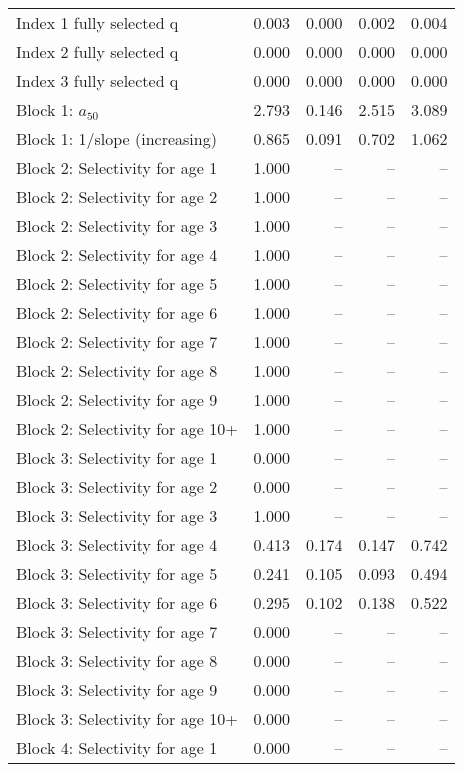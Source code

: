 \documentclass[
]{article}
\begin{document}
\begin{landscape}
\begin{longtable}[t]{lrrrr}
\endfoot
\bottomrule
\endlastfoot
Index 1 fully selected q & 0.003 & 0.000 & 0.002 & 0.004\\
Index 2 fully selected q & 0.000 & 0.000 & 0.000 & 0.000\\
Index 3 fully selected q & 0.000 & 0.000 & 0.000 & 0.000\\
Block 1: $a_{50}$ & 2.793 & 0.146 & 2.515 & 3.089\\
Block 1: 1/slope (increasing) & 0.865 & 0.091 & 0.702 & 1.062\\
\addlinespace
Block 2: Selectivity for age 1 & 1.000 & -- & -- & --\\
Block 2: Selectivity for age 2 & 1.000 & -- & -- & --\\
Block 2: Selectivity for age 3 & 1.000 & -- & -- & --\\
Block 2: Selectivity for age 4 & 1.000 & -- & -- & --\\
Block 2: Selectivity for age 5 & 1.000 & -- & -- & --\\
\addlinespace
Block 2: Selectivity for age 6 & 1.000 & -- & -- & --\\
Block 2: Selectivity for age 7 & 1.000 & -- & -- & --\\
Block 2: Selectivity for age 8 & 1.000 & -- & -- & --\\
Block 2: Selectivity for age 9 & 1.000 & -- & -- & --\\
Block 2: Selectivity for age 10+ & 1.000 & -- & -- & --\\
\addlinespace
Block 3: Selectivity for age 1 & 0.000 & -- & -- & --\\
Block 3: Selectivity for age 2 & 0.000 & -- & -- & --\\
Block 3: Selectivity for age 3 & 1.000 & -- & -- & --\\
Block 3: Selectivity for age 4 & 0.413 & 0.174 & 0.147 & 0.742\\
Block 3: Selectivity for age 5 & 0.241 & 0.105 & 0.093 & 0.494\\
\addlinespace
Block 3: Selectivity for age 6 & 0.295 & 0.102 & 0.138 & 0.522\\
Block 3: Selectivity for age 7 & 0.000 & -- & -- & --\\
Block 3: Selectivity for age 8 & 0.000 & -- & -- & --\\
Block 3: Selectivity for age 9 & 0.000 & -- & -- & --\\
Block 3: Selectivity for age 10+ & 0.000 & -- & -- & --\\
\addlinespace
Block 4: Selectivity for age 1 & 0.000 & -- & -- & --\\

\end{longtable}
\end{landscape}
\end{document}
